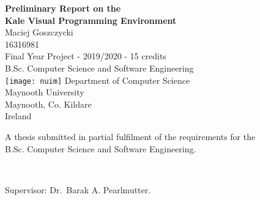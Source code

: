 \begin{titlepage}
\begin{center}
	\vspace{10mm}
	\begin{LARGE}
		\textbf{Preliminary Report on the \\ Kale Visual Programming Environment}\\
		\vspace{25mm}
		Maciej Goszczycki\\
		16316981\\
		Final Year Project - 2019/2020 - 15 credits\\
		B.Sc. Computer Science and Software Engineering\\
		\vspace{32mm}
		\texttt{[image: nuim]}
		\vspace{5mm}
		Department of Computer Science\\
		Maynooth University\\
		Maynooth, Co. Kildare\\
		Ireland\\
	\end{LARGE}
	
	\vspace{22mm}
	
	\begin{large}A thesis submitted in partial fulfilment of the requirements for
	the \\ B.Sc. Computer Science and Software Engineering.\end{large}\\
	\vspace{15mm}
	\begin{LARGE}Supervisor: Dr.\ Barak A. Pearlmutter.\end{LARGE}
\end{center}
\end{titlepage}
